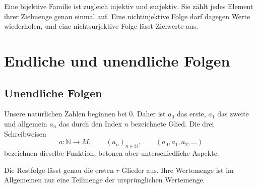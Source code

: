 \documentclass[main.tex]{subfiles}
\begin{document}

Eine bijektive Familie ist zugleich injektiv und surjektiv. Sie zählt jedes
Element ihrer Zielmenge genau einmal auf. Eine nichtinjektive Folge darf
dagegen Werte wiederholen, und eine nichtsurjektive Folge lässt Zielwerte aus.

\chapter{Endliche und unendliche Folgen}

\section{Unendliche Folgen}


Unsere natürlichen Zahlen beginnen bei \(0\). Daher ist \(a_0\) das erste,
\(a_1\) das zweite und allgemein \(a_n\) das durch den Index \(n\)
bezeichnete Glied. Die drei Schreibweisen
\[
  a\colon\mathbb N\to M,
  \qquad (a_n)_{n\in\mathbb N},
  \qquad (a_0,a_1,a_2,\ldots)
\]
bezeichnen dieselbe Funktion, betonen aber unterschiedliche Aspekte.


Die Restfolge lässt genau die ersten \(r\) Glieder aus. Ihre Wertemenge ist
im Allgemeinen nur eine Teilmenge der ursprünglichen Wertemenge.

\end{document}
